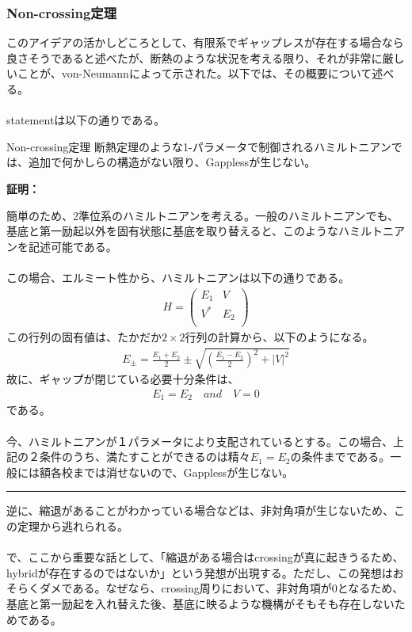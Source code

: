 \documentclass[a4paper,10.5pt]{article}
\numberwithin{equation}{section}
\newenvironment{proofbox}
{\begin{prooflabel}\textbf{証明：}\end{prooflabel}\vspace{0.8em}}
{\par\vspace{1em}\hrule\vspace{1em}}
\begin{document}
\begin{enumerate}
\subsubsection{Non-crossing定理}
このアイデアの活かしどころとして、有限系でギャップレスが存在する場合なら良さそうであると述べたが、断熱のような状況を考える限り、それが非常に厳しいことが、von-Neumannによって示された。以下では、その概要について述べる。\\
\\
statementは以下の通りである。
\begin{theorembox}{Non-crossing定理}
    断熱定理のような1-パラメータで制御されるハミルトニアンでは、追加で何かしらの構造がない限り、Gapplessが生じない。
\end{theorembox}
\begin{proofbox}
    簡単のため、2準位系のハミルトニアンを考える。一般のハミルトニアンでも、基底と第一励起以外を固有状態に基底を取り替えると、このようなハミルトニアンを記述可能である。\\
    \\
    この場合、エルミート性から、ハミルトニアンは以下の通りである。
    \begin{align*}
        H=\begin{pmatrix}
            E_{1} & V\\
            V^{*} & E_{2}\\
        \end{pmatrix}
    \end{align*}
    この行列の固有値は、たかだか$2\times 2$行列の計算から、以下のようになる。
    \begin{align*}
        E_{\pm}=\frac{E_{1}+E_{2}}{2}\pm \sqrt{(\frac{E_{1}-E_{2}}{2})^{2}+|V|^{2}}
    \end{align*}
    故に、ギャップが閉じている必要十分条件は、
    \begin{align*}
        E_{1}=E_{2}\quad and \quad V=0
    \end{align*}
    である。\\
    \\
    今、ハミルトニアンが１パラメータにより支配されているとする。この場合、上記の２条件のうち、満たすことができるのは精々$E_{1}=E_{2}$の条件までである。一般には額各校までは消せないので、Gapplessが生じない。
\end{proofbox}
逆に、縮退があることがわかっている場合などは、非対角項が生じないため、この定理から逃れられる。\\
\\
で、ここから重要な話として、「縮退がある場合はcrossingが真に起きうるため、hybridが存在するのではないか」という発想が出現する。ただし、この発想はおそらくダメである。なぜなら、crossing周りにおいて、非対角項が0となるため、基底と第一励起を入れ替えた後、基底に映るような機構がそもそも存在しないためである。


\end{enumerate}
\end{document}
